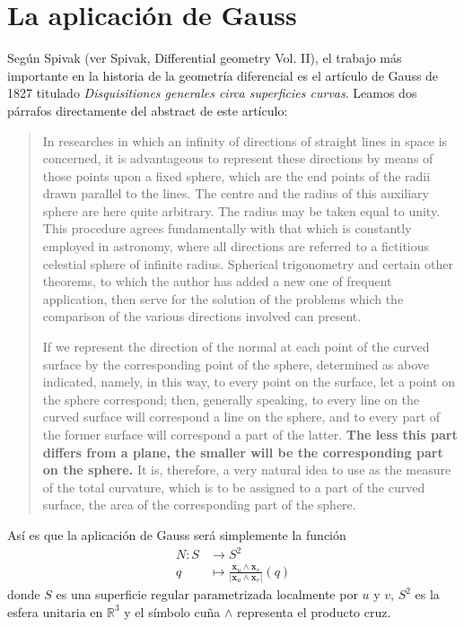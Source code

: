 \documentclass[spanish]{book}
\theoremstyle{definition}
\begin{document}
\chapter{La aplicación de Gauss}
Según Spivak (ver Spivak, Differential geometry Vol. II), el trabajo más importante en la historia de la geometría diferencial es el artículo de Gauss de 1827 titulado \textit{Disquisitiones generales circa superficies curvas}. Leamos dos párrafos directamente del abstract de este artículo:
\begin{quotation}
	In researches in which an infinity of directions of straight lines in space is concerned, it is advantageous to represent these directions by means of those points upon a fixed sphere, which are the end points of the radii drawn parallel to the lines. The centre and the radius of this auxiliary sphere are here quite arbitrary. The radius may be taken equal to unity. This procedure agrees fundamentally with that which is constantly employed in astronomy, where all directions are referred to a fictitious celestial sphere of infinite radius. Spherical trigonometry and certain other theorems, to which the author has added a new one of frequent application, then serve for the solution of the problems which the comparison of the various directions involved can present.
	
	If we represent the direction of the normal at each point of the curved surface by the corresponding point of the sphere, determined as above indicated, namely, in this way, to every point on the surface, let a point on the sphere correspond; then, generally speaking, to every line on the curved surface will correspond a line on the sphere, and to every part of the former surface will correspond a part of the latter. \textbf{The less this part differs from a plane, the smaller will be the corresponding part on the sphere.} It is, therefore, a very natural idea to use as the measure of the total curvature, which is to be assigned to a part of the curved surface, the area of the corresponding part of the sphere.
\end{quotation}
Así es que la aplicación de Gauss será simplemente la función
\begin{align*}
	N:S&\to S^2\\
	q&\mapsto\frac{\mathbf{x}_u\wedge\mathbf{x}_v}{|\mathbf{x}_u\wedge\mathbf{x}_v|}(q)
\end{align*}
donde $S$ es una superficie regular parametrizada localmente por $u$ y $v$, $S^2$ es la esfera unitaria en $\mathbb{R}^3$ y el símbolo cuña $\wedge$ representa el producto cruz.
\end{document}
